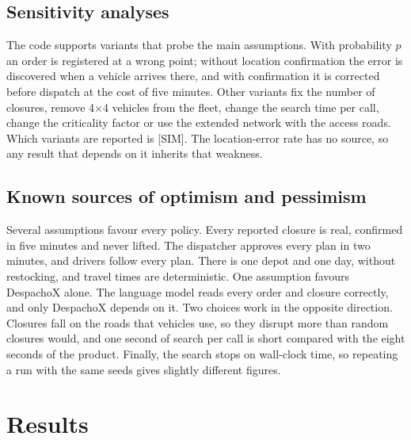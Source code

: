 \documentclass[11pt]{article}
\newcommand{\pend}[1]{\textcolor{red!60!black}{#1}}
\begin{document}
\subsection{Sensitivity analyses}

The code supports variants that probe the main assumptions. With probability $p$ an order is registered at a wrong point; without location confirmation the error is discovered when a vehicle arrives there, and with confirmation it is corrected before dispatch at the cost of five minutes. Other variants fix the number of closures, remove 4$\times$4 vehicles from the fleet, change the search time per call, change the criticality factor or use the extended network with the access roads. Which variants are reported is \pend{[SIM]}. The location-error rate has no source, so any result that depends on it inherits that weakness.

\subsection{Known sources of optimism and pessimism}

Several assumptions favour every policy. Every reported closure is real, confirmed in five minutes and never lifted. The dispatcher approves every plan in two minutes, and drivers follow every plan. There is one depot and one day, without restocking, and travel times are deterministic. One assumption favours DespachoX alone. The language model reads every order and closure correctly, and only DespachoX depends on it. Two choices work in the opposite direction. Closures fall on the roads that vehicles use, so they disrupt more than random closures would, and one second of search per call is short compared with the eight seconds of the product. Finally, the search stops on wall-clock time, so repeating a run with the same seeds gives slightly different figures.

\section{Results}\label{sec:results}

\end{document}
